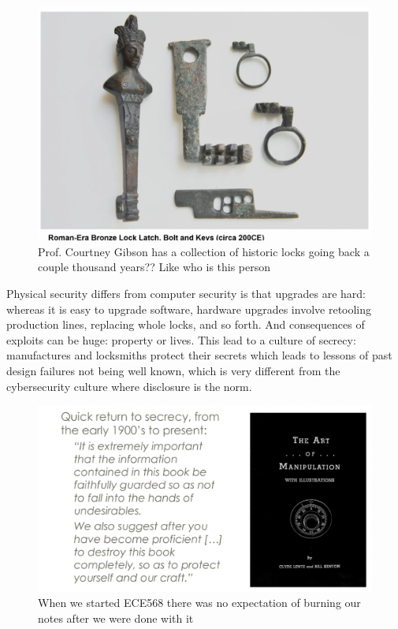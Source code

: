 \documentclass[../notes.tex]{subfiles}
\begin{document}
\begin{figure}[H]
    \centering
    \includegraphics[width=0.8\linewidth]{img/image_2023-04-16-20-39-07.png}
    \caption{Prof. Courtney Gibson has a collection of historic locks going back a couple thousand years?? Like who is this person}
\end{figure}


Physical security differs from computer security is that upgrades are hard: whereas it is easy to upgrade software, hardware upgrades involve retooling production lines, replacing whole locks, and so forth. And consequences of exploits can be huge: property or lives.
This lead to a culture of secrecy: manufactures and locksmiths protect their secrets which leads to lessons of past design failures not being well known, which is very different from the cybersecurity culture where disclosure is the norm.


\begin{figure}[H]
    \centering
    \includegraphics[width=0.8\linewidth]{img/image_2023-04-16-20-45-45.png}
    \caption{When we started ECE568 there was no expectation of burning our notes after we were done with it}
\end{figure}
\end{document}
